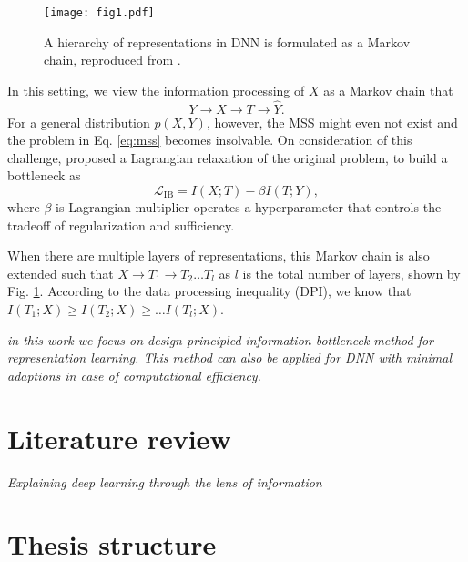 \begin{figure}[t]
  \centering
  \texttt{[image: fig1.pdf]}
  \caption{A hierarchy of representations in DNN is formulated as a Markov chain, reproduced from .}
  \label{fig:hierarchy_dnn}
\end{figure}

In this setting, we view the information processing of $X$ as a Markov chain that
\begin{equation}
 Y \to X \to T \to \hat{Y}.
\end{equation}
For a general distribution $p(X,Y)$, however, the MSS might even not exist and the problem in Eq. \eqref{eq:mss} becomes insolvable. On consideration of this challenge, \citet{tishby2000information} proposed a Lagrangian relaxation of the original problem, to build a bottleneck as
\begin{equation}
 \mathcal{L}_{\text{IB}} =  I(X;T) - \beta I(T;Y),
\end{equation}
where $\beta$ is Lagrangian multiplier operates a hyperparameter that controls the tradeoff of regularization and sufficiency.

When there are multiple layers of representations, this Markov chain is also extended such that $X \to T_1 \to T_2 \dots T_l$ as $l$ is the total number of layers, shown by Fig. \ref{fig:hierarchy_dnn}. According to the data processing inequality (DPI), we know that $I(T_1;X) \geq I(T_2;X) \geq \dots I(T_l;X)$.



\emph{in this work we focus on design principled information bottleneck method for representation learning. This method can also be applied for DNN with minimal adaptions in case of computational efficiency.}


\section{Literature review}

\emph{Explaining deep learning through the lens of information}

\section{Thesis structure}

